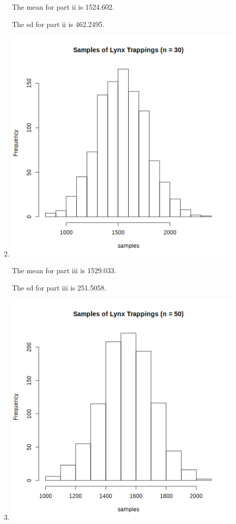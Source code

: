 \documentclass[12pt,letterpaper]{article}
\begin{document}
\begin{enumerate}
\begin{enumerate}
\begin{enumerate}
              The mean for part ii is \num{1524.602}.

              The sd for part ii is \num{462.2495}.
            \item
              \includegraphics[width=\linewidth]{prob3b_iii.png}

              The mean for part iii is \num{1529.033}.

              The sd for part iii is \num{251.5058}.
            \item
              \includegraphics[width=\linewidth]{prob3b_iv.png}


\end{enumerate}
\end{enumerate}
\end{enumerate}
\end{document}
